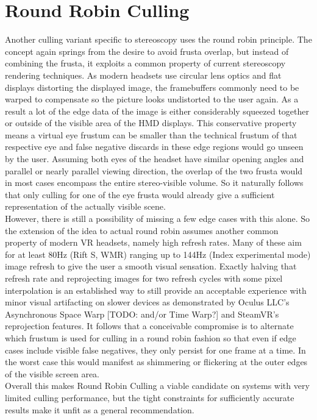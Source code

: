 {\section{Round Robin Culling}
Another culling variant specific to stereoscopy uses the round robin principle. The concept again springs from the desire to avoid frusta overlap, but instead of combining the frusta, it exploits a common property of current stereoscopy rendering techniques. As modern headsets use circular lens optics and flat displays distorting the displayed image, the framebuffers commonly need to be warped to compensate so the picture looks undistorted to the user again. As a result a lot of the edge data of the image is either considerably squeezed together or outside of the visible area of the HMD displays.
This conservative property means a virtual eye frustum can be smaller than the technical frustum of that respective eye and false negative discards in these edge regions would go unseen by the user.
Assuming both eyes of the headset have similar opening angles and parallel or nearly parallel viewing direction, the overlap of the two frusta would in most cases encompass the entire stereo-visible volume. So it naturally follows that only culling for one of the eye frusta would already give a sufficient representation of the actually visible scene. \\

However, there is still a possibility of missing a few edge cases with this alone. So the extension of the idea to actual round robin assumes another common property of modern VR headsets, namely high refresh rates. Many of these aim for at least 80Hz (Rift S, WMR) ranging up to 144Hz (Index experimental mode) image refresh to give the user a smooth visual sensation.
Exactly halving that refresh rate and reprojecting images for two refresh cycles with some pixel interpolation is an established way to still provide an acceptable experience with minor visual artifacting on slower devices as demonstrated by Oculus LLC's Asynchronous Space Warp [TODO: and/or Time Warp?] and SteamVR's reprojection features. It follows that a conceivable compromise is to alternate which frustum is used for culling in a round robin fashion so that even if edge cases include visible false negatives, they only persist for one frame at a time. In the worst case this would manifest as shimmering or flickering at the outer edges of the visible screen area. \\
Overall this makes Round Robin Culling a viable candidate on systems with very limited culling performance, but the tight constraints for sufficiently accurate results make it unfit as a general recommendation. \\

}

